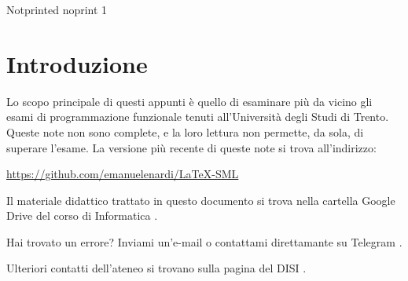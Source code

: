 \begin{ocg} [printocg = never] {Notprinted} {noprint} {1}
\section*{Introduzione}

Lo scopo principale di questi appunti è quello di esaminare più da vicino gli esami di programmazione funzionale tenuti all'Università degli Studi di Trento. Queste note non sono complete, e la loro lettura non permette, da sola, di superare l’esame. La versione più recente di queste note si trova all'indirizzo:

\begin{center}
	\url{https://github.com/emanuelenardi/LaTeX-SML}
\end{center}

Il materiale didattico trattato in questo documento si trova nella cartella Google Drive del corso di Informatica %
\href{https://bit.ly/drive-folder}{\ExternalLink}.

\medskip
Hai trovato un errore? Inviami un'e-mail \href{mailto:emanuele.nardi@studenti.unitn.it}{\ExternalLink} o contattami direttamante su Telegram \href{https://t.me/emanuelenardi}{\ExternalLink}.

\medskip
Ulteriori contatti dell'ateneo si trovano sulla pagina del DISI %
\href{http://offertaformativa.unitn.it/it/l/informatica/contatti-e-referenti}{\ExternalLink}.

\tableofcontents					%
\lstlistoflistings					%
%
\end{ocg}
